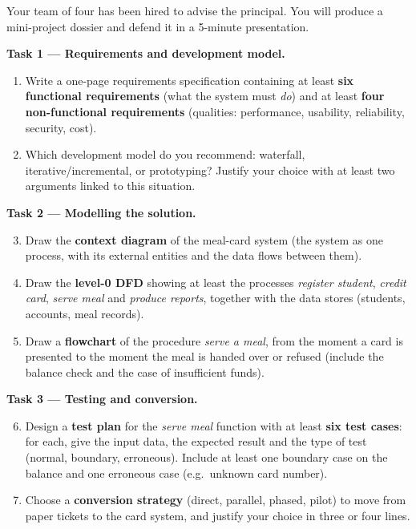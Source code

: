 \documentclass[11pt]{article}
\newcounter{popsec}
\newcounter{popsub}
\newcommand{\courssub}[1]{%
  \stepcounter{popsub}%
  \par\vspace{9pt}\noindent{\popxbold\fontsize{11.5}{13}\selectfont\color{popink}{\color{poporange}\thepopsec.\thepopsub}\hspace{6pt}#1}\par\nopagebreak\vspace{4pt}
}
\begin{document}
Your team of four has been hired to advise the principal. You will produce a mini-project dossier and defend it in a 5-minute presentation.

\courssub{Tasks}

\textbf{Task 1 — Requirements and development model.}

\begin{enumerate}
\item Write a one-page requirements specification containing at least \textbf{six functional requirements} (what the system must \emph{do}) and at least \textbf{four non-functional requirements} (qualities: performance, usability, reliability, security, cost).
\item Which development model do you recommend: waterfall, iterative/incremental, or prototyping? Justify your choice with at least two arguments linked to this situation.
\end{enumerate}

\textbf{Task 2 — Modelling the solution.}

\begin{enumerate}
\setcounter{enumi}{2}
\item Draw the \textbf{context diagram} of the meal-card system (the system as one process, with its external entities and the data flows between them).
\item Draw the \textbf{level-0 DFD} showing at least the processes \emph{register student}, \emph{credit card}, \emph{serve meal} and \emph{produce reports}, together with the data stores (students, accounts, meal records).
\item Draw a \textbf{flowchart} of the procedure \emph{serve a meal}, from the moment a card is presented to the moment the meal is handed over or refused (include the balance check and the case of insufficient funds).
\end{enumerate}

\textbf{Task 3 — Testing and conversion.}

\begin{enumerate}
\setcounter{enumi}{5}
\item Design a \textbf{test plan} for the \emph{serve meal} function with at least \textbf{six test cases}: for each, give the input data, the expected result and the type of test (normal, boundary, erroneous). Include at least one boundary case on the balance and one erroneous case (e.g.\ unknown card number).
\item Choose a \textbf{conversion strategy} (direct, parallel, phased, pilot) to move from paper tickets to the card system, and justify your choice in three or four lines.
\end{enumerate}
\end{document}
